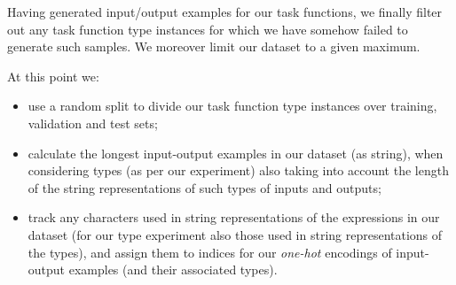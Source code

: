 \documentclass{article} %
\begin{document}
Having generated input/output examples for our task functions,
we finally filter out any task function type instances for which we have somehow failed to generate such samples.
We moreover limit our dataset to a given maximum.

At this point we:
\begin{itemize}
    \item use a random split to divide our task function type instances over training, validation and test sets;
    \item calculate the longest input-output examples in our dataset (as string), when considering types (as per our experiment) also taking into account the length of the string representations of such types of inputs and outputs;
    \item track any characters used in string representations of the expressions in our dataset
    (for our type experiment also those used in string representations of the types),
    and assign them to indices for our \emph{one-hot} encodings of input-output examples (and their associated types).
\end{itemize}




\end{document}

